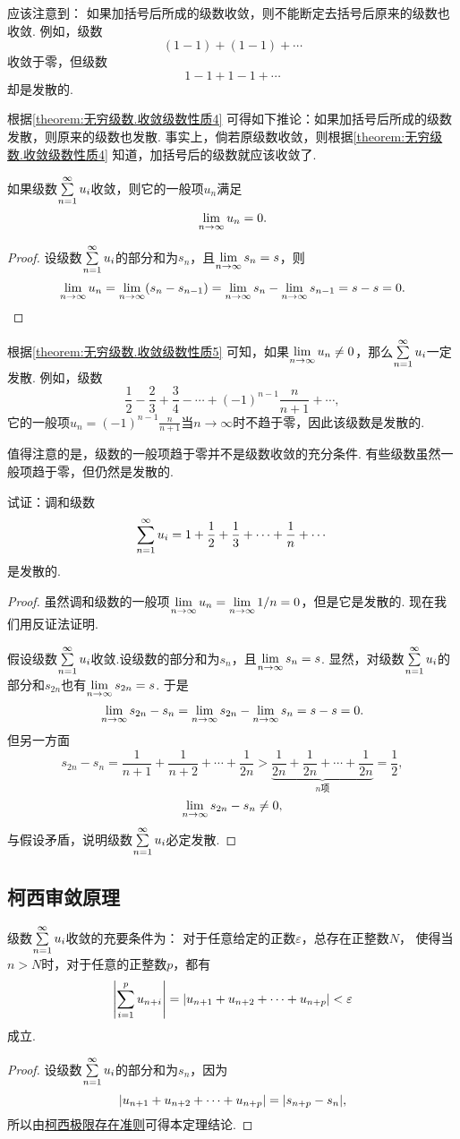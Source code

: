 应该注意到：
如果加括号后所成的级数收敛，则不能断定去括号后原来的级数也收敛.
例如，级数\[
(1-1)+(1-1)+\dotsb
\]收敛于零，但级数\[
1-1+1-1+\dotsb
\]却是发散的.

根据\cref{theorem:无穷级数.收敛级数性质4} 可得如下推论：{\color{red}如果加括号后所成的级数发散，则原来的级数也发散.}
事实上，倘若原级数收敛，则根据\cref{theorem:无穷级数.收敛级数性质4} 知道，加括号后的级数就应该收敛了.

\begin{property}[级数收敛的必要条件]\label{theorem:无穷级数.收敛级数性质5}
如果级数\(\sum\limits_{n=1}^\infty u_i\)收敛，则它的一般项\(u_n\)满足\[
\lim\limits_{n\to\infty} u_n = 0.
\]
\begin{proof}
设级数\(\sum\limits_{n=1}^\infty u_i\)的部分和为\(s_n\)，且\(\lim\limits_{n\to\infty} s_n = s\)，则\[
\lim\limits_{n\to\infty} u_n = \lim\limits_{n\to\infty}(s_n - s_{n-1}) = \lim\limits_{n\to\infty} s_n - \lim\limits_{n\to\infty} s_{n-1} = s - s = 0.
\qedhere
\]
\end{proof}
\end{property}

根据\cref{theorem:无穷级数.收敛级数性质5} 可知，如果\(\lim\limits_{n\to\infty} u_n \neq 0\)，那么\(\sum\limits_{n=1}^\infty u_i\)一定发散.
例如，级数\[
\frac{1}{2}-\frac{2}{3}+\frac{3}{4}-\dotsb+(-1)^{n-1}\frac{n}{n+1}+\dotsb,
\]它的一般项\(u_n = (-1)^{n-1} \frac{n}{n+1}\)当\(n\to\infty\)时不趋于零，因此该级数是发散的.

值得注意的是，级数的一般项趋于零并不是级数收敛的充分条件.
有些级数虽然一般项趋于零，但仍然是发散的.
\begin{example}\label{example:无穷级数.调和级数的收敛性}
试证：调和级数\[
\sum\limits_{n=1}^\infty u_i = 1+\frac{1}{2}+\frac{1}{3}+\dotsb+\frac{1}{n}+\dotsb
\]是发散的.
\begin{proof}
虽然调和级数的一般项\(\lim\limits_{n\to\infty} u_n = \lim\limits_{n\to\infty} 1/n = 0\)，但是它是发散的.
现在我们用反证法证明.

假设级数\(\sum\limits_{n=1}^\infty u_i\)收敛.设级数的部分和为\(s_n\)，且\(\lim\limits_{n\to\infty} s_n = s\).
显然，对级数\(\sum\limits_{n=1}^\infty u_i\)的部分和\(s_{2n}\)也有\(\lim\limits_{n\to\infty} s_{2n} = s\).
于是\[
\lim\limits_{n\to\infty} {s_{2n}-s_n} = \lim\limits_{n\to\infty} s_{2n} - \lim\limits_{n\to\infty} s_n = s - s = 0.
\]但另一方面\[
s_{2n} - s_n = \frac{1}{n+1}+\frac{1}{n+2}+\dotsb+\frac{1}{2n}
> \underbrace{\frac{1}{2n}+\frac{1}{2n}+\dotsb+\frac{1}{2n}}_{n\text{项}}
= \frac{1}{2},
\]\[
\lim\limits_{n\to\infty} {s_{2n}-s_n} \neq 0,
\]与假设矛盾，说明级数\(\sum\limits_{n=1}^\infty u_i\)必定发散.
\end{proof}
\end{example}

\subsection{柯西审敛原理}
\begin{theorem}[柯西审敛原理]\label{theorem:无穷级数.级数的柯西审敛原理}
级数\(\sum\limits_{n=1}^\infty u_i\)收敛的充要条件为：
对于任意给定的正数\(\varepsilon\)，总存在正整数\(N\)，%
使得当\(n>N\)时，对于任意的正整数\(p\)，都有\[
\abs{ \sum\limits_{i=1}^p u_{n+i} }
= \abs{u_{n+1}+u_{n+2}+\dotsb+u_{n+p}}
< \varepsilon
\]成立.
\begin{proof}
设级数\(\sum\limits_{n=1}^\infty u_i\)的部分和为\(s_n\)，因为\[
\abs{u_{n+1}+u_{n+2}+\dotsb+u_{n+p}} = \abs{s_{n+p}-s_n},
\]所以由\hyperref[theorem:极限.数列的柯西极限存在准则]{柯西极限存在准则}可得本定理结论.
\end{proof}
\end{theorem}

